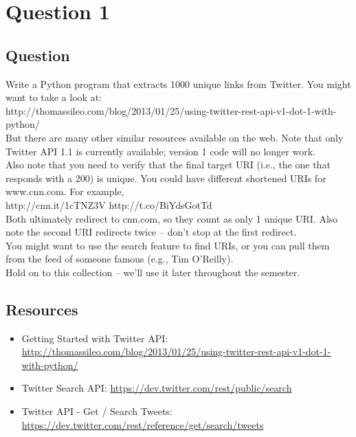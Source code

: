 \section{Question 1}

\subsection{Question}
Write a Python program that extracts 1000 unique links from
Twitter.  You might want to take a look at:\\

http://thomassileo.com/blog/2013/01/25/using-twitter-rest-api-v1-dot-1-with-python/\\

But there are many other similar resources available on the web.  Note
that only Twitter API 1.1 is currently available; version 1 code will
no longer work.\\

Also note that you need to verify that the final target URI (i.e., the
one that responds with a 200) is unique.  You could have different
shortened URIs for www.cnn.com.  For example, \\

http://cnn.it/1cTNZ3V
http://t.co/BiYdsGotTd\\

Both ultimately redirect to cnn.com, so they count as only 1 unique URI.
Also note the second URI redirects twice -- don't stop at the first
redirect.\\

You might want to use the search feature to find URIs, or you can
pull them from the feed of someone famous (e.g., Tim O'Reilly).\\

Hold on to this collection -- we'll use it later throughout the semester.\\

\subsection{Resources}
\begin{itemize}
\item Getting Started with Twitter API: \url{http://thomassileo.com/blog/2013/01/25/using-twitter-rest-api-v1-dot-1-with-python/}
\item Twitter Search API: \url{https://dev.twitter.com/rest/public/search}
\item Twitter API - Get / Search Tweets: \url{https://dev.twitter.com/rest/reference/get/search/tweets}
\end{itemize}

